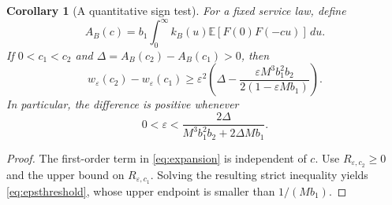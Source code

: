 \documentclass[11pt,reqno]{amsart}
\numberwithin{equation}{section}
\theoremstyle{plain}
\newtheorem{corollary}[theorem]{Corollary}
\theoremstyle{definition}
\newcommand{\E}{\mathbb E}
\newcommand{\1}{\mathbf 1}
\newcommand{\eps}{\varepsilon}
\begin{document}
\begin{corollary}[A quantitative sign test]\label{cor:signtest}
For a fixed service law, define
\begin{equation}\label{eq:coefficient}
 A_B(c)=b_1\int_0^\infty k_B(u)\E[F(0)F(-cu)]\,du.
\end{equation}
If $0<c_1<c_2$ and $\Delta=A_B(c_2)-A_B(c_1)>0$, then
\begin{equation}\label{eq:signlower}
 w_\eps(c_2)-w_\eps(c_1)
 \ge\eps^2\left(\Delta-
 \frac{\eps M^3b_1^2b_2}{2(1-\eps M b_1)}\right).
\end{equation}
In particular, the difference is positive whenever
\begin{equation}\label{eq:epsthreshold}
 0<\eps<\frac{2\Delta}{M^3b_1^2b_2+2\Delta M b_1}.
\end{equation}
\end{corollary}
\begin{proof}
The first-order term in \eqref{eq:expansion} is independent of $c$. Use $R_{\eps,c_2}\ge0$ and the upper bound on $R_{\eps,c_1}$. Solving the resulting strict inequality yields \eqref{eq:epsthreshold}, whose upper endpoint is smaller than $1/(M b_1)$.
\end{proof}
\end{document}
